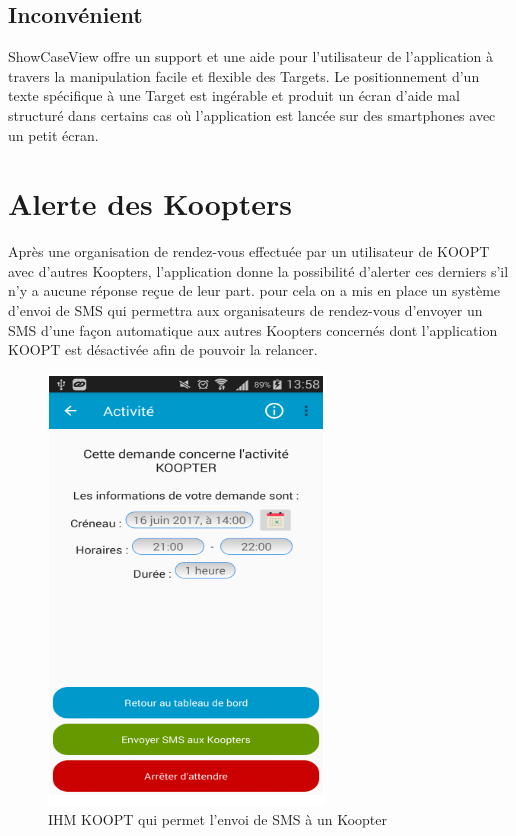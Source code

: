 \subsection{Inconvénient}

ShowCaseView offre un support et une aide pour l’utilisateur de l’application à travers la manipulation facile et flexible des Targets.
Le positionnement d'un texte spécifique à une Target est ingérable et produit un écran d’aide mal structuré dans certains cas où l’application est lancée sur des smartphones avec un petit écran.

\section{Alerte des Koopters}
Après une organisation de rendez-vous effectuée par un utilisateur de KOOPT avec d’autres Koopters,  l’application donne la possibilité d’alerter ces derniers s'il n’y a aucune réponse reçue  de leur part. pour cela on a mis en place un système d’envoi de SMS qui permettra aux organisateurs de rendez-vous d’envoyer un SMS d’une façon automatique aux autres Koopters concernés dont l’application KOOPT est désactivée afin de pouvoir la relancer.

 \begin{figure}[H]
\begin{center}
\includegraphics[width=0.5\linewidth]{images/sendsms}
\end{center}
\caption{IHM KOOPT qui permet l'envoi de SMS à un Koopter}
\label{fig:15}
\end{figure}


